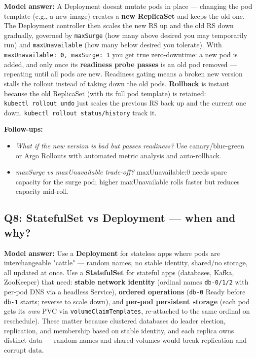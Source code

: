\documentclass[11pt]{article}
\providecommand{\tightlist}{\setlength{\itemsep}{1pt}\setlength{\parskip}{0pt}}
\begin{document}
\textbf{Model answer:}
A Deployment doesn\textquotesingle t mutate pods in place --- changing the pod template (e.g., a new image) creates a \textbf{new ReplicaSet} and keeps the old one. The Deployment controller then scales the new RS up and the old RS down gradually, governed by \texttt{maxSurge} (how many above desired you may temporarily run) and \texttt{maxUnavailable} (how many below desired you tolerate). With \texttt{maxUnavailable:\ 0,\ maxSurge:\ 1} you get true zero-downtime: a new pod is added, and only once its \textbf{readiness probe passes} is an old pod removed --- repeating until all pods are new. Readiness gating means a broken new version stalls the rollout instead of taking down the old pods. \textbf{Rollback} is instant because the old ReplicaSet (with its full pod template) is retained: \texttt{kubectl\ rollout\ undo} just scales the previous RS back up and the current one down. \texttt{kubectl\ rollout\ status/history} track it.

\textbf{Follow-ups:}

\begin{itemize}
\tightlist
\item
  \emph{What if the new version is bad but passes readiness?} Use canary/blue-green or Argo Rollouts with automated metric analysis and auto-rollback.
\item
  \emph{maxSurge vs maxUnavailable trade-off?} maxUnavailable:0 needs spare capacity for the surge pod; higher maxUnavailable rolls faster but reduces capacity mid-roll.
\end{itemize}

\subsection{Q8: StatefulSet vs Deployment --- when and why?}\label{q8-statefulset-vs-deployment--when-and-why}

\textbf{Model answer:}
Use a \textbf{Deployment} for stateless apps where pods are interchangeable "cattle" --- random names, no stable identity, shared/no storage, all updated at once. Use a \textbf{StatefulSet} for stateful apps (databases, Kafka, ZooKeeper) that need: \textbf{stable network identity} (ordinal names \texttt{db-0/1/2} with per-pod DNS via a headless Service), \textbf{ordered operations} (\texttt{db-0} Ready before \texttt{db-1} starts; reverse to scale down), and \textbf{per-pod persistent storage} (each pod gets its \emph{own} PVC via \texttt{volumeClaimTemplates}, re-attached to the same ordinal on reschedule). These matter because clustered databases do leader election, replication, and membership based on stable identity, and each replica owns distinct data --- random names and shared volumes would break replication and corrupt data.
\end{document}
